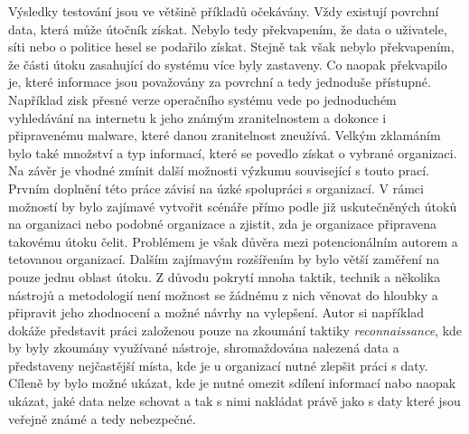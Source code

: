 Výsledky testování jsou ve většině příkladů očekávány.
Vždy existují povrchní data, která může útočník získat.
Nebylo tedy překvapením, že data o uživatele, síti nebo o politice hesel se podařilo získat.
Stejně tak však nebylo překvapením, že části útoku zasahující do systému více byly zastaveny.
Co naopak překvapilo je, které informace jsou považovány za povrchní a tedy jednoduše přístupné.
Například zisk přesné verze operačního systému vede po jednoduchém vyhledávání na internetu k jeho známým zranitelnostem a dokonce i připravenému malware, které danou zranitelnost zneužívá.
Velkým zklamáním bylo také množství a typ informací, které se povedlo získat o vybrané organizaci.
Na závěr je vhodné zmínit další možnosti výzkumu související s touto prací.
Prvním doplnění této práce závisí na úzké spolupráci s organizací.
V rámci možností by bylo zajímavé vytvořit scénáře přímo podle již uskutečněných útoků na organizaci nebo podobné organizace a zjistit, zda je organizace připravena takovému útoku čelit.
Problémem je však důvěra mezi potencionálním autorem a tetovanou organizací.
Dalším zajímavým rozšířením by bylo větší zaměření na pouze jednu oblast útoku.
Z důvodu pokrytí mnoha taktik, technik a několika nástrojů a metodologií není možnost se žádnému z nich věnovat do hloubky a připravit jeho zhodnocení a možné návrhy na vylepšení.
Autor si například dokáže představit práci založenou pouze na zkoumání taktiky \textit{reconnaissance}, kde by byly zkoumány využívané nástroje, shromaždována nalezená data a představeny nejčastější místa, kde je u organizací nutné zlepšit práci s daty.
Cíleně by bylo možné ukázat, kde je nutné omezit sdílení informací nabo naopak ukázat, jaké data nelze schovat a tak s nimi nakládat právě jako s daty které jsou veřejně známé a tedy nebezpečné.













